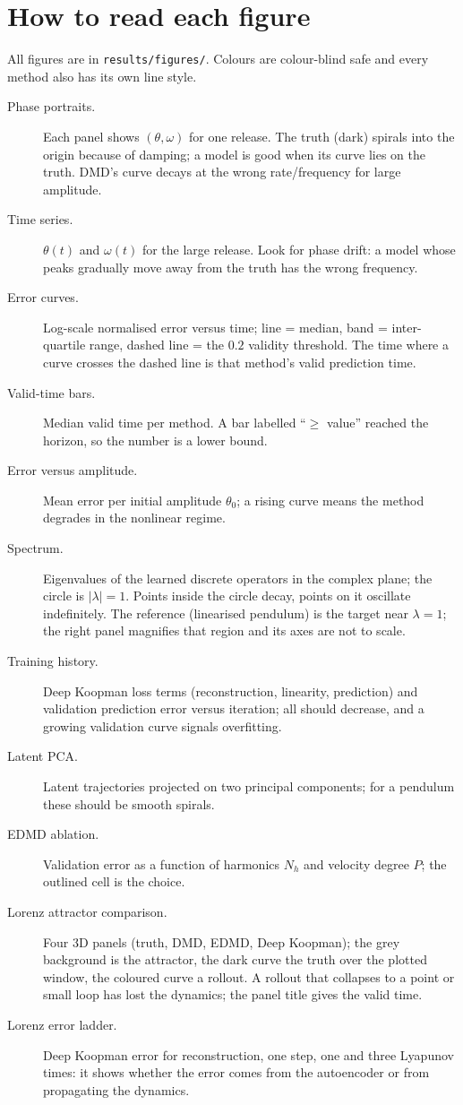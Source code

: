 \documentclass[11pt,a4paper]{article}
\newcommand{\code}[1]{\texttt{#1}}
\begin{document}
\section{How to read each figure}

All figures are in \code{results/figures/}. Colours are colour-blind safe and every method also has its own line style.
\begin{description}
\item[Phase portraits.] Each panel shows $(\theta,\omega)$ for one release. The truth (dark) spirals into the origin because of
damping; a model is good when its curve lies on the truth. DMD's curve decays at the wrong rate/frequency for large amplitude.
\item[Time series.] $\theta(t)$ and $\omega(t)$ for the large release. Look for phase drift: a model whose peaks gradually
move away from the truth has the wrong frequency.
\item[Error curves.] Log-scale normalised error versus time; line = median, band = inter-quartile range, dashed line = the $0.2$
validity threshold. The time where a curve crosses the dashed line is that method's valid prediction time.
\item[Valid-time bars.] Median valid time per method. A bar labelled ``$\geq$ value'' reached the horizon, so the number is a
lower bound.
\item[Error versus amplitude.] Mean error per initial amplitude $\theta_0$; a rising curve means the method degrades in the
nonlinear regime.
\item[Spectrum.] Eigenvalues of the learned discrete operators in the complex plane; the circle is $|\lambda|=1$. Points inside
the circle decay, points on it oscillate indefinitely. The reference (linearised pendulum) is the target near $\lambda=1$; the
right panel magnifies that region and its axes are not to scale.
\item[Training history.] Deep Koopman loss terms (reconstruction, linearity, prediction) and validation prediction error versus
iteration; all should decrease, and a growing validation curve signals overfitting.
\item[Latent PCA.] Latent trajectories projected on two principal components; for a pendulum these should be smooth spirals.
\item[EDMD ablation.] Validation error as a function of harmonics $N_h$ and velocity degree $P$; the outlined cell is the choice.
\item[Lorenz attractor comparison.] Four 3D panels (truth, DMD, EDMD, Deep Koopman); the grey background is the attractor, the
dark curve the truth over the plotted window, the coloured curve a rollout. A rollout that collapses to a point or small loop
has lost the dynamics; the panel title gives the valid time.
\item[Lorenz error ladder.] Deep Koopman error for reconstruction, one step, one and three Lyapunov times: it shows whether
the error comes from the autoencoder or from propagating the dynamics.
\end{description}
\end{document}
